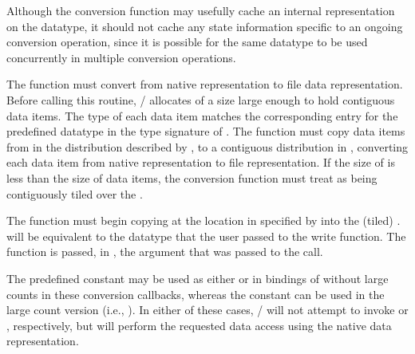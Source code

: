\begin{users}
Although the conversion function may usefully cache an
internal representation on the datatype, it should not cache
any state information specific to an ongoing conversion
operation, since it is possible for the same datatype to
be used concurrently in multiple conversion operations.
\end{users}

The function  must convert from
native representation to file data representation.
Before calling this routine,
\MPI/ allocates  of a size large enough to hold 
contiguous data items.
The type of each data item matches the
corresponding entry for the predefined datatype
in the type signature of .
The function must copy  data items from
 in the distribution described by 
,
to a contiguous distribution in , converting each data item
from native representation to file representation.
If the size of  is less than the size
of 
data items,
the conversion function must treat
 as being contiguously tiled over the
.

The function must
begin copying at the location in  specified by
 into the (tiled) .
 will be equivalent to the datatype
that the user passed to the 
write 
function.
The function is passed, in ,
the argument that was passed to the  call.

The predefined constant 
may be used as either
 or 
in bindings of  without large counts in these conversion callbacks,
whereas the constant
can be used in the large count version
(i.e., ).
In either of these cases, \MPI/ will
not attempt to invoke  or 
, respectively, but will perform 
the requested data access using the native data representation.

